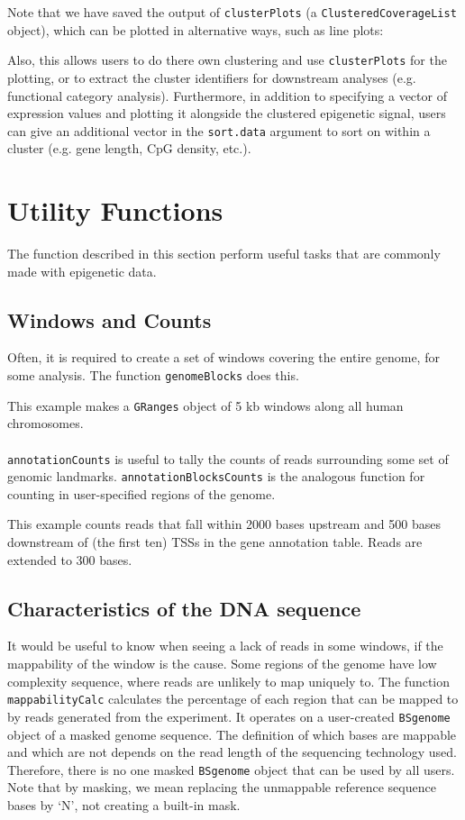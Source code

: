 \documentclass[a4paper, 12pt]{article}
\begin{document}
Note that we have saved the output of \texttt{clusterPlots} (a \texttt{ClusteredCoverageList} object), which can be plotted in alternative ways, such as line plots: 



Also, this allows users to do there own clustering and use \texttt{clusterPlots} for the plotting, or to extract the cluster identifiers for downstream analyses (e.g. functional category analysis).  Furthermore, in addition to specifying a vector of expression values and plotting it alongside the clustered epigenetic signal, users can give an additional vector in the \texttt{sort.data} argument to sort on within a cluster (e.g. gene length, CpG density, etc.).

\section{Utility Functions}

The function described in this section perform useful tasks that are commonly made with epigenetic data.
\subsection{Windows and Counts}
Often, it is required to create a set of windows covering the entire genome, for some analysis. The function \texttt{genomeBlocks} does this.



\noindent This example makes a \texttt{GRanges} object of 5 kb windows along all human chromosomes.
\ \\ \ \\
\texttt{annotationCounts} is useful to tally the counts of reads surrounding some set of genomic landmarks. \texttt{annotationBlocksCounts} is the analogous function for counting in user-specified regions of the genome.


	
\noindent This example counts reads that fall within 2000 bases upstream and 500 bases downstream of (the first ten) TSSs in the gene annotation table.  Reads are extended to 300 bases.

\subsection{Characteristics of the DNA sequence}
It would be useful to know when seeing a lack of reads in some windows, if the mappability of the window is the cause. Some regions of the genome have low complexity sequence, where reads are unlikely to map uniquely to. The function \texttt{mappabilityCalc} calculates the percentage of each region that can be mapped to by reads generated from the experiment. It operates on a user-created \texttt{BSgenome} object of a masked genome sequence. The definition of which bases are mappable and which are not depends on the read length of the sequencing technology used. Therefore, there is no one masked \texttt{BSgenome} object that can be used by all users. Note that by masking, we mean replacing the unmappable reference sequence bases by `N', not creating a built-in mask.
\end{document}
